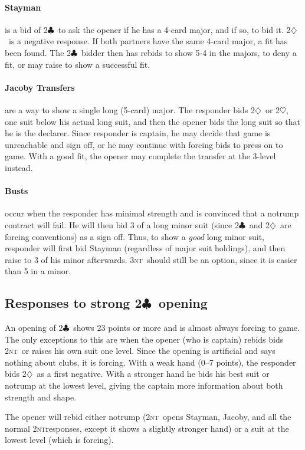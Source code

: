 \documentclass[11pt]{article}
\def\C{$\clubsuit$}
\def\D{$\diamondsuit$}
\def\H{$\heartsuit$}
\def\NT{\textsc{nt}}
\begin{document}
\paragraph{Stayman} is a bid of 2\C\ to ask the opener if he has a 
4-card major, and if so, to bid it.  2\D\ is a negative response.
If both partners have the same 4-card major, a fit has been found.
The 2\C\ bidder then has rebids to show 5-4 in the majors, to deny
a fit, or may raise to show a successful fit.

\paragraph{Jacoby Transfers} are a way to show a single long (5-card) major.
The responder bids 2\D\ or 2\H, one suit below his actual long suit,
and then the opener bids the long suit so that he is the declarer.
Since responder is captain, he may decide that game is unreachable and
sign off, or he may continue with forcing bids to press on to game.  With
a good fit, the opener may complete the transfer at the 3-level instead.

\paragraph{Busts} occur when the responder has minimal strength and is
convinced that a notrump contract will fail.  He will then bid 3 of a
long minor suit (since 2\C\ and 2\D\ are forcing conventions) as a
sign off.  Thus, to show a \emph{good} long minor suit, responder will
first bid Stayman (regardless of major suit holdings), and then raise
to 3 of his minor afterwards.  3\NT\ should still be an option, since
it is easier than 5 in a minor.


\subsection{Responses to strong 2\C\ opening}

An opening of 2\C\ shows 23 points or more and is almost always forcing
to game.  The only exceptions to this are when the opener (who is captain)
rebids bids 2\NT\ or raises his own suit one level.  Since the opening
is artificial and says nothing about clubs, it is forcing.  With a weak
hand (0--7 points), the responder bids 2\D\ as a first negative.  With
a stronger hand he bids his best suit or notrump at the lowest level,
giving the captain more information about both strength and shape.

The opener will rebid either notrump (2\NT\ opens Stayman, Jacoby, and
all the normal 2\NT responses, except it shows a slightly stronger hand)
or a suit at the lowest level (which is forcing).
\end{document}
